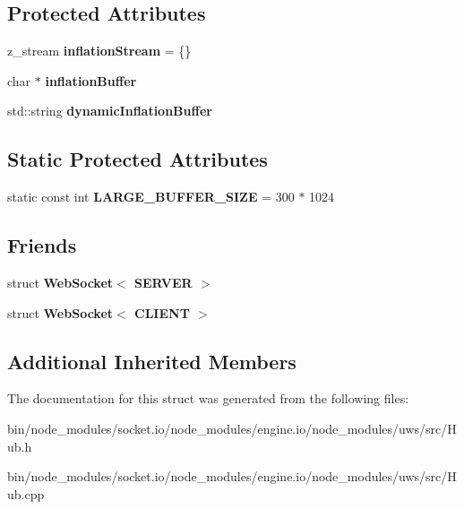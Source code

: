 \subsection*{Protected Attributes}
\begin{DoxyCompactItemize}
\item 
\mbox{\label{structu_w_s_1_1_hub_abb90e7137aac2432cc1f1ba860e4850b}} 
z\+\_\+stream {\bfseries inflation\+Stream} = \{\}
\item 
\mbox{\label{structu_w_s_1_1_hub_a90554f551d9a0491fa1f961892cb2ad1}} 
char $\ast$ {\bfseries inflation\+Buffer}
\item 
\mbox{\label{structu_w_s_1_1_hub_a852d46f8481baccb0c596a3869fb6058}} 
std\+::string {\bfseries dynamic\+Inflation\+Buffer}
\end{DoxyCompactItemize}
\subsection*{Static Protected Attributes}
\begin{DoxyCompactItemize}
\item 
\mbox{\label{structu_w_s_1_1_hub_abee117e7a2c7937edb2ef0f8eecade58}} 
static const int {\bfseries L\+A\+R\+G\+E\+\_\+\+B\+U\+F\+F\+E\+R\+\_\+\+S\+I\+ZE} = 300 $\ast$ 1024
\end{DoxyCompactItemize}
\subsection*{Friends}
\begin{DoxyCompactItemize}
\item 
\mbox{\label{structu_w_s_1_1_hub_a59a072ca504bc988c166406901bdfacd}} 
struct {\bfseries Web\+Socket$<$ S\+E\+R\+V\+E\+R $>$}
\item 
\mbox{\label{structu_w_s_1_1_hub_a6242a8d2f1a91f1c79adfda569fb7fc1}} 
struct {\bfseries Web\+Socket$<$ C\+L\+I\+E\+N\+T $>$}
\end{DoxyCompactItemize}
\subsection*{Additional Inherited Members}


The documentation for this struct was generated from the following files\+:\begin{DoxyCompactItemize}
\item 
bin/node\+\_\+modules/socket.\+io/node\+\_\+modules/engine.\+io/node\+\_\+modules/uws/src/Hub.\+h\item 
bin/node\+\_\+modules/socket.\+io/node\+\_\+modules/engine.\+io/node\+\_\+modules/uws/src/Hub.\+cpp\end{DoxyCompactItemize}

